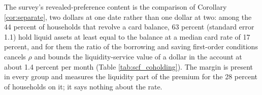 The survey's revealed-preference content is the comparison of Corollary \ref{cor:separate}, two dollars at one date rather than one dollar at two: among the 44 percent of households that revolve a card balance, 63 percent (standard error 1.1) hold liquid assets at least equal to the balance at a median card rate of 17 percent, and for them the ratio of the borrowing and saving first-order conditions cancels $\rho$ and bounds the liquidity-service value of a dollar in the account at about 1.4 percent per month (Table \ref{tab:scf_coholding}). The margin is present in every group and measures the liquidity part of the premium for the 28 percent of households on it; it says nothing about the rate.
